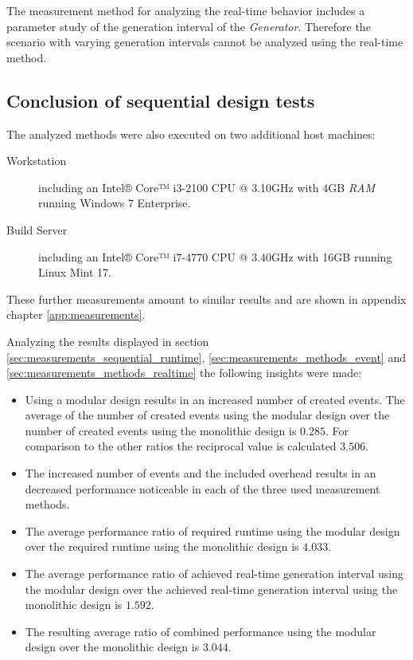 The measurement method for analyzing the real-time behavior includes a parameter study of the generation interval of the \emph{Generator}.
Therefore the scenario with varying generation intervals cannot be analyzed using the real-time method.

\subsection{Conclusion of sequential design tests}
\label{sec:measurements_sequential_conclusion}

The analyzed methods were also executed on two additional host machines:

\begin{description}
    \item[Workstation] including an Intel® Core™ i3-2100 CPU @ 3.10GHz with 4GB \emph{RAM} running Windows 7 Enterprise.
    \item[Build Server] including an Intel® Core™ i7-4770 CPU @ 3.40GHz with 16GB running Linux Mint 17.
\end{description}

These further measurements amount to similar results and are shown in appendix chapter \ref{app:measurements}.

Analyzing the results displayed in section \ref{sec:measurements_sequential_runtime}, \ref{sec:measurements_methods_event} and \ref{sec:measurements_methods_realtime} the following insights were made:

\begin{itemize}
    \item Using a modular design results in an increased number of created events.
    The average of the number of created events using the modular design over the number of created events using the monolithic design is $0.285$.
    For comparison to the other ratios the reciprocal value is calculated $3.506$.
    \item The increased number of events and the included overhead results in an decreased performance noticeable in each of the three used measurement methods.
    \item The average performance ratio of required runtime using the modular design over the required runtime using the monolithic design is $4.033$.
    \item The average performance ratio of achieved real-time generation interval using the modular design over the achieved real-time generation interval using the monolithic design is $1.592$.
    \item The resulting average ratio of combined performance using the modular design over the monolithic design is $3.044$.
\end{itemize}

